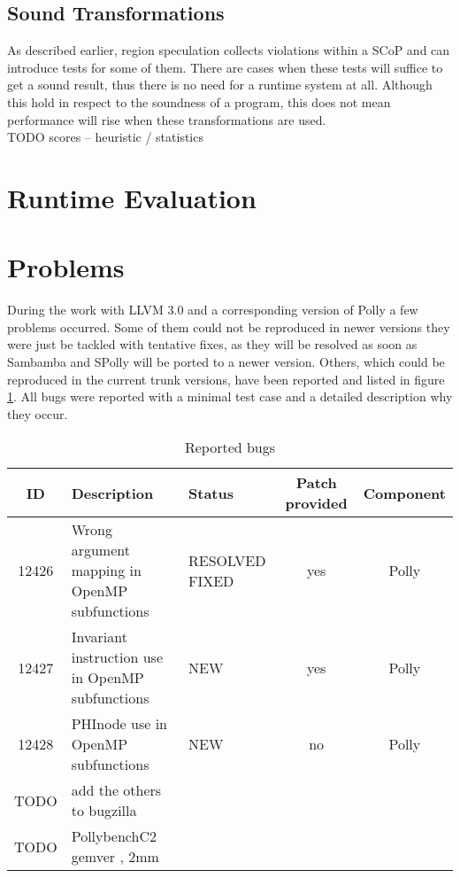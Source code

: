 \subsection{Sound Transformations}
\label{soundCTtransformations}
As described earlier, region speculation collects violations within a SCoP 
and can introduce tests for some of them. There are cases when these tests will
suffice to get a sound result, thus there is no need for a runtime system at all.
Although this hold in respect to the soundness of a program, this does not mean 
performance will rise when these transformations are used.  \\
TODO scores -- heuristic / statistics 


\section{Runtime Evaluation}


\section{Problems}
During the work with LLVM 3.0 and a corresponding version of Polly a few
problems occurred. Some of them could not be reproduced in newer versions
they were just be tackled with tentative fixes, as they will be resolved as soon
as Sambamba and SPolly will be ported to a newer version.
Others, which could be reproduced in the current trunk versions,
have been reported and listed in figure \ref{tab:bugreports}. All bugs were 
reported with a minimal test case and a detailed description why they occur.

\begin{table}[htbp]
  \caption{Reported bugs}
  \begin{tabularx}{\textwidth}{ c | X | p{2cm} | c | c }
   ID & Description & Status & Patch provided  & Component \\
  \hline \hline
  12426 & Wrong argument mapping in OpenMP subfunctions & RESOLVED FIXED & yes & Polly \\
   \hline
  12427 & Invariant instruction use in OpenMP subfunctions & NEW & yes & Polly \\
   \hline
  12428 & PHInode use in OpenMP subfunctions & NEW & no & Polly \\
   \hline
  TODO & add the others to bugzilla & & & \\
  TODO & PollybenchC2 gemver , 2mm & & & \\
  \end{tabularx}
  \label{tab:bugreports}
\end{table}
